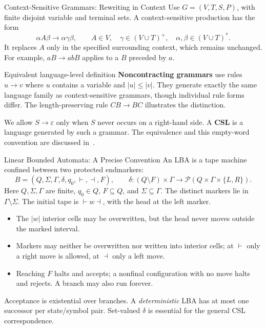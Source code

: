 \documentclass[10pt]{beamer}
\begin{document}
\begin{frame}{Context-Sensitive Grammars: Rewriting in Context}
  \small
  Use $G=(V,T,S,P)$, with finite disjoint variable and terminal sets.
  A context-sensitive production has the form
  \[
    \alpha A\beta\to\alpha\gamma\beta,
    \qquad A\in V,\quad \gamma\in(V\cup T)^+,
    \quad \alpha,\beta\in(V\cup T)^*.
  \]
  It replaces $A$ only in the specified surrounding context, which remains
  unchanged. For example, $aB\to abB$ applies to a $B$ preceded by $a$.
  \begin{block}{Equivalent language-level definition}
    \textbf{Noncontracting grammars} use rules $u\to v$ where $u$ contains
    a variable and $|u|\le|v|$. They generate exactly the same language
    family as context-sensitive grammars, though individual rule forms differ.
    The length-preserving rule $CB\to BC$ illustrates the distinction.
  \end{block}
  We allow $S\to\varepsilon$ only when $S$ never occurs on a right-hand
  side. A \textbf{CSL} is a language generated by such a grammar.
  The equivalence and this empty-word convention are discussed in~\cite{gallier-csg}.
\end{frame}

\begin{frame}{Linear Bounded Automata: A Precise Convention}
  \small
  An LBA is a tape machine confined between two protected endmarkers:
  \[
    B=(Q,\Sigma,\Gamma,\delta,q_0,\vdash,\dashv,F),\qquad
    \delta:(Q\setminus F)\times\Gamma
       \to\mathcal P(Q\times\Gamma\times\{L,R\}).
  \]
  Here $Q,\Sigma,\Gamma$ are finite, $q_0\in Q$, $F\subseteq Q$, and
  $\Sigma\subseteq\Gamma$. The distinct markers lie in $\Gamma\setminus\Sigma$.
  The initial tape is $\vdash w\dashv$, with the head at the left marker.
  \begin{itemize}
    \item The $|w|$ interior cells may be overwritten, but the head never
      moves outside the marked interval.
    \item Markers may neither be overwritten nor written into interior cells;
      at $\vdash$ only a right move is allowed, at $\dashv$ only a left move.
    \item Reaching $F$ halts and accepts; a nonfinal configuration with no
      move halts and rejects. A branch may also run forever.
  \end{itemize}
  Acceptance is existential over branches. A \emph{deterministic} LBA has
  at most one successor per state/symbol pair. Set-valued $\delta$ is
  essential for the general CSL correspondence.
\end{frame}
\end{document}
